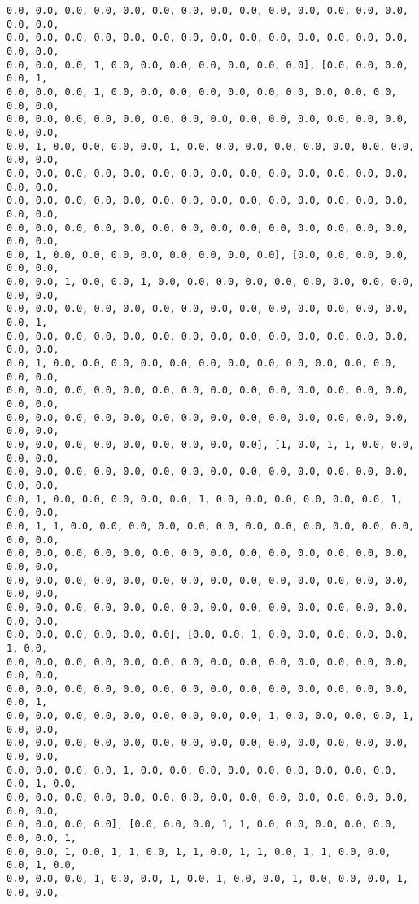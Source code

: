 \documentclass[11pt]{article}
\begin{document}
\begin{Verbatim}[commandchars=\\\{\}]
0.0, 0.0, 0.0, 0.0, 0.0, 0.0, 0.0, 0.0, 0.0, 0.0, 0.0, 0.0, 0.0, 0.0, 0.0, 0.0,
0.0, 0.0, 0.0, 0.0, 0.0, 0.0, 0.0, 0.0, 0.0, 0.0, 0.0, 0.0, 0.0, 0.0, 0.0, 0.0,
0.0, 0.0, 0.0, 1, 0.0, 0.0, 0.0, 0.0, 0.0, 0.0, 0.0], [0.0, 0.0, 0.0, 0.0, 1,
0.0, 0.0, 0.0, 1, 0.0, 0.0, 0.0, 0.0, 0.0, 0.0, 0.0, 0.0, 0.0, 0.0, 0.0, 0.0,
0.0, 0.0, 0.0, 0.0, 0.0, 0.0, 0.0, 0.0, 0.0, 0.0, 0.0, 0.0, 0.0, 0.0, 0.0, 0.0,
0.0, 1, 0.0, 0.0, 0.0, 0.0, 1, 0.0, 0.0, 0.0, 0.0, 0.0, 0.0, 0.0, 0.0, 0.0, 0.0,
0.0, 0.0, 0.0, 0.0, 0.0, 0.0, 0.0, 0.0, 0.0, 0.0, 0.0, 0.0, 0.0, 0.0, 0.0, 0.0,
0.0, 0.0, 0.0, 0.0, 0.0, 0.0, 0.0, 0.0, 0.0, 0.0, 0.0, 0.0, 0.0, 0.0, 0.0, 0.0,
0.0, 0.0, 0.0, 0.0, 0.0, 0.0, 0.0, 0.0, 0.0, 0.0, 0.0, 0.0, 0.0, 0.0, 0.0, 0.0,
0.0, 1, 0.0, 0.0, 0.0, 0.0, 0.0, 0.0, 0.0, 0.0], [0.0, 0.0, 0.0, 0.0, 0.0, 0.0,
0.0, 0.0, 1, 0.0, 0.0, 1, 0.0, 0.0, 0.0, 0.0, 0.0, 0.0, 0.0, 0.0, 0.0, 0.0, 0.0,
0.0, 0.0, 0.0, 0.0, 0.0, 0.0, 0.0, 0.0, 0.0, 0.0, 0.0, 0.0, 0.0, 0.0, 0.0, 1,
0.0, 0.0, 0.0, 0.0, 0.0, 0.0, 0.0, 0.0, 0.0, 0.0, 0.0, 0.0, 0.0, 0.0, 0.0, 0.0,
0.0, 1, 0.0, 0.0, 0.0, 0.0, 0.0, 0.0, 0.0, 0.0, 0.0, 0.0, 0.0, 0.0, 0.0, 0.0,
0.0, 0.0, 0.0, 0.0, 0.0, 0.0, 0.0, 0.0, 0.0, 0.0, 0.0, 0.0, 0.0, 0.0, 0.0, 0.0,
0.0, 0.0, 0.0, 0.0, 0.0, 0.0, 0.0, 0.0, 0.0, 0.0, 0.0, 0.0, 0.0, 0.0, 0.0, 0.0,
0.0, 0.0, 0.0, 0.0, 0.0, 0.0, 0.0, 0.0, 0.0], [1, 0.0, 1, 1, 0.0, 0.0, 0.0, 0.0,
0.0, 0.0, 0.0, 0.0, 0.0, 0.0, 0.0, 0.0, 0.0, 0.0, 0.0, 0.0, 0.0, 0.0, 0.0, 0.0,
0.0, 1, 0.0, 0.0, 0.0, 0.0, 0.0, 1, 0.0, 0.0, 0.0, 0.0, 0.0, 0.0, 1, 0.0, 0.0,
0.0, 1, 1, 0.0, 0.0, 0.0, 0.0, 0.0, 0.0, 0.0, 0.0, 0.0, 0.0, 0.0, 0.0, 0.0, 0.0,
0.0, 0.0, 0.0, 0.0, 0.0, 0.0, 0.0, 0.0, 0.0, 0.0, 0.0, 0.0, 0.0, 0.0, 0.0, 0.0,
0.0, 0.0, 0.0, 0.0, 0.0, 0.0, 0.0, 0.0, 0.0, 0.0, 0.0, 0.0, 0.0, 0.0, 0.0, 0.0,
0.0, 0.0, 0.0, 0.0, 0.0, 0.0, 0.0, 0.0, 0.0, 0.0, 0.0, 0.0, 0.0, 0.0, 0.0, 0.0,
0.0, 0.0, 0.0, 0.0, 0.0, 0.0], [0.0, 0.0, 1, 0.0, 0.0, 0.0, 0.0, 0.0, 1, 0.0,
0.0, 0.0, 0.0, 0.0, 0.0, 0.0, 0.0, 0.0, 0.0, 0.0, 0.0, 0.0, 0.0, 0.0, 0.0, 0.0,
0.0, 0.0, 0.0, 0.0, 0.0, 0.0, 0.0, 0.0, 0.0, 0.0, 0.0, 0.0, 0.0, 0.0, 0.0, 1,
0.0, 0.0, 0.0, 0.0, 0.0, 0.0, 0.0, 0.0, 0.0, 1, 0.0, 0.0, 0.0, 0.0, 1, 0.0, 0.0,
0.0, 0.0, 0.0, 0.0, 0.0, 0.0, 0.0, 0.0, 0.0, 0.0, 0.0, 0.0, 0.0, 0.0, 0.0, 0.0,
0.0, 0.0, 0.0, 0.0, 1, 0.0, 0.0, 0.0, 0.0, 0.0, 0.0, 0.0, 0.0, 0.0, 0.0, 1, 0.0,
0.0, 0.0, 0.0, 0.0, 0.0, 0.0, 0.0, 0.0, 0.0, 0.0, 0.0, 0.0, 0.0, 0.0, 0.0, 0.0,
0.0, 0.0, 0.0, 0.0], [0.0, 0.0, 0.0, 1, 1, 0.0, 0.0, 0.0, 0.0, 0.0, 0.0, 0.0, 1,
0.0, 0.0, 1, 0.0, 1, 1, 0.0, 1, 1, 0.0, 1, 1, 0.0, 1, 1, 0.0, 0.0, 0.0, 1, 0.0,
0.0, 0.0, 0.0, 1, 0.0, 0.0, 1, 0.0, 1, 0.0, 0.0, 1, 0.0, 0.0, 0.0, 1, 0.0, 0.0,

\end{Verbatim}
\end{document}
